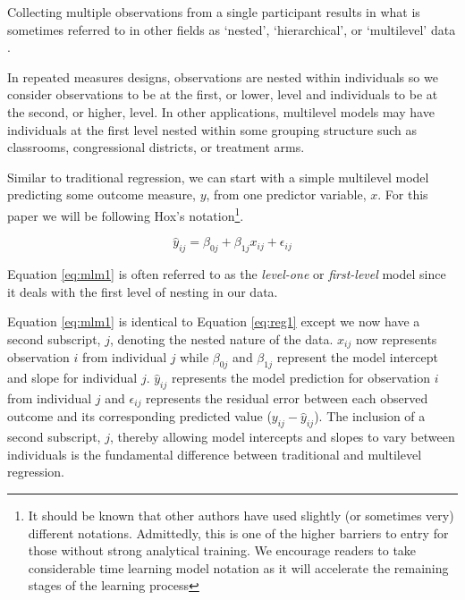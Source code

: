 \documentclass[
]{article}
\begin{document}
Collecting multiple observations from a single participant results in what is sometimes referred to in other fields as `nested', `hierarchical', or `multilevel' data \cite{aarts2014, boisgontier2016, raudenbush2002, schielzeth2013, zuur2009}.

In repeated measures designs, observations are nested within individuals so we consider observations to be at the first, or lower, level and individuals to be at the second, or higher, level. In other applications, multilevel models may have individuals at the first level nested within some grouping structure such as classrooms, congressional districts, or treatment arms.

Similar to traditional regression, we can start with a simple multilevel model predicting some outcome measure, \(y\), from one predictor variable, \(x\). For this paper we will be following Hox's \cite{hox2017} notation\footnote{It should be known that other authors have used slightly (or sometimes very) different notations. Admittedly, this is one of the higher barriers to entry for those without strong analytical training. We encourage readers to take considerable time learning model notation as it will accelerate the remaining stages of the learning process}.

\begin{equation}
\hat{y}_{ij}=\beta_{0j}+\beta_{1j}x_{ij}+\epsilon_{ij}
\label{eq:mlm1}
\end{equation}

\noindent
Equation \ref{eq:mlm1} is often referred to as the \emph{level-one} or \emph{first-level} model since it deals with the first level of nesting in our data.

Equation \ref{eq:mlm1} is identical to Equation \ref{eq:reg1} except we now have a second subscript, \(j\), denoting the nested nature of the data. \(x_{ij}\) now represents observation \(i\) from individual \(j\) while \(\beta_{0j}\) and \(\beta_{1j}\) represent the model intercept and slope for individual \(j\). \(\hat{y}_{ij}\) represents the model prediction for observation \(i\) from individual \(j\) and \(\epsilon_{ij}\) represents the residual error between each observed outcome and its corresponding predicted value (\(y_{ij}-\hat{y}_{ij}\)). The inclusion of a second subscript, \(j\), thereby allowing model intercepts and slopes to vary between individuals is the fundamental difference between traditional and multilevel regression.
\end{document}
